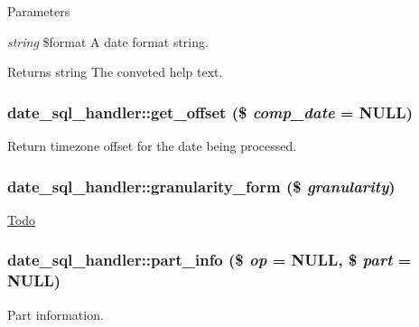 \begin{DoxyParams}{Parameters}
\item[{\em string}]\$format A date format string.\end{DoxyParams}
\begin{DoxyReturn}{Returns}
string The conveted help text. 
\end{DoxyReturn}
\hypertarget{classdate__sql__handler_a4c0829b7a4ab472cb070c19e1608dc7a}{
\subsubsection[{get\_\-offset}]{\setlength{\rightskip}{0pt plus 5cm}date\_\-sql\_\-handler::get\_\-offset (\$ {\em comp\_\-date} = {\ttfamily NULL})}}
\label{classdate__sql__handler_a4c0829b7a4ab472cb070c19e1608dc7a}
Return timezone offset for the date being processed. \hypertarget{classdate__sql__handler_add4b2f59b4d1da58336ffa0afcd97f03}{
\subsubsection[{granularity\_\-form}]{\setlength{\rightskip}{0pt plus 5cm}date\_\-sql\_\-handler::granularity\_\-form (\$ {\em granularity})}}
\label{classdate__sql__handler_add4b2f59b4d1da58336ffa0afcd97f03}
\begin{Desc}
\item[\hyperlink{todo__todo000024}{Todo}]\end{Desc}
\hypertarget{classdate__sql__handler_a867091165b26b483cbf7301978871d26}{
\subsubsection[{part\_\-info}]{\setlength{\rightskip}{0pt plus 5cm}date\_\-sql\_\-handler::part\_\-info (\$ {\em op} = {\ttfamily NULL}, \/  \$ {\em part} = {\ttfamily NULL})}}
\label{classdate__sql__handler_a867091165b26b483cbf7301978871d26}
Part information.


